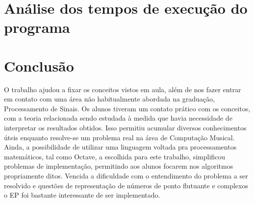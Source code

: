 \documentclass[brazil,times]{abnt}
\begin{document}
\section*{Análise dos tempos de execução do programa}



\section*{Conclusão}
	O trabalho ajudou a fixar os conceitos vistos em aula, além de nos fazer entrar em contato com uma área não habitualmente abordada na graduação, Processamento de Sinais. Os alunos tiveram um contato prático com os conceitos, com a teoria relacionada sendo estudada à medida que havia necessidade de interpretar os resultados obtidos. Isso permitiu acumular diversos conhecimentos úteis enquanto resolve-se um problema real na área de Computação Musical. Ainda, a possibilidade de utilizar uma linguagem voltada pra processamentos matemáticos, tal como Octave, a escolhida para este trabalho, simplificou problemas de implementação, permitindo aos alunos focarem nos algoritmos propriamente ditos. Vencida a dificuldade com o entendimento do problema a ser resolvido e questões de representação de números de ponto flutuante e complexos o EP foi bastante interessante de ser implementado.
	
\nocite{*}


\end{document}
